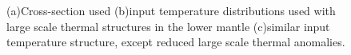 \documentclass[12pt]{article}
\begin{document}
\begin{figure}[H]
{\hspace{-1.cm}
}
\caption{(a)Cross-section used (b)input temperature distributions used with large scale thermal structures in the lower mantle (c)similar input temperature structure, except reduced large scale thermal anomalies.}
\label{fig:xsection2sumatra}
\end{figure}
\end{document}
